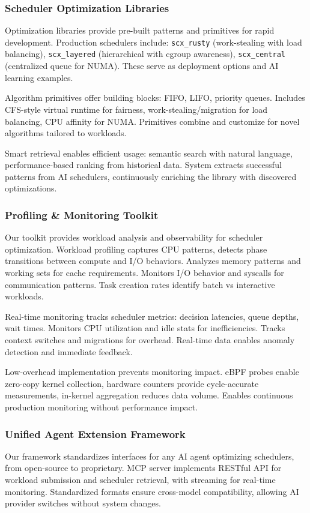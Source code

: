 \subsubsection{Scheduler Optimization Libraries}
Optimization libraries provide pre-built patterns and primitives for rapid development. Production schedulers include: \texttt{scx\_rusty} (work-stealing with load balancing), \texttt{scx\_layered} (hierarchical with cgroup awareness), \texttt{scx\_central} (centralized queue for NUMA). These serve as deployment options and AI learning examples.

Algorithm primitives offer building blocks: FIFO, LIFO, priority queues. Includes CFS-style virtual runtime for fairness, work-stealing/migration for load balancing, CPU affinity for NUMA. Primitives combine and customize for novel algorithms tailored to workloads.

Smart retrieval enables efficient usage: semantic search with natural language, performance-based ranking from historical data. System extracts successful patterns from AI schedulers, continuously enriching the library with discovered optimizations.

\subsubsection{Profiling \& Monitoring Toolkit}
Our toolkit provides workload analysis and observability for scheduler optimization. Workload profiling captures CPU patterns, detects phase transitions between compute and I/O behaviors. Analyzes memory patterns and working sets for cache requirements. Monitors I/O behavior and syscalls for communication patterns. Task creation rates identify batch vs interactive workloads.

Real-time monitoring tracks scheduler metrics: decision latencies, queue depths, wait times. Monitors CPU utilization and idle stats for inefficiencies. Tracks context switches and migrations for overhead. Real-time data enables anomaly detection and immediate feedback.

Low-overhead implementation prevents monitoring impact. eBPF probes enable zero-copy kernel collection, hardware counters provide cycle-accurate measurements, in-kernel aggregation reduces data volume. Enables continuous production monitoring without performance impact.

\subsubsection{Unified Agent Extension Framework}
Our framework standardizes interfaces for any AI agent optimizing schedulers, from open-source to proprietary. MCP server implements RESTful API for workload submission and scheduler retrieval, with streaming for real-time monitoring. Standardized formats ensure cross-model compatibility, allowing AI provider switches without system changes.


